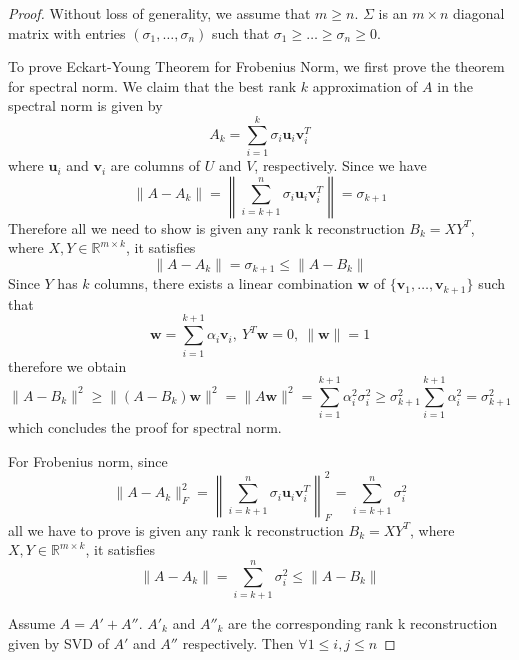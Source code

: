 \documentclass[../book-template.tex]{subfiles}
\begin{document}
\begin{proof}
Without loss of generality, we assume that $m\geq n$. $\Sigma$ is an $m\times n$ diagonal matrix with entries $(\sigma_1,\dots,\sigma_n)$ such that $\sigma_1\geq\dots\geq \sigma_n\geq 0$.
\par To prove Eckart-Young Theorem for Frobenius Norm, we first prove the theorem for spectral norm. We claim that the best rank $k$ approximation of $A$ in the spectral norm is given by
\begin{equation*}
    A_k = \sum_{i=1}^{k}\sigma_i\bm{u}_i\bm{v}^T_i
\end{equation*}
where $\bm{u}_i$ and $\bm{v}_i$ are columns of $U$ and $V$, respectively. Since we have
\begin{equation*}
    \|A-A_k\| = \left\|\sum_{i=k+1}^{n}\sigma_i\bm{u}_i\bm{v}^T_i\right\| = \sigma_{k+1}
\end{equation*}
Therefore all we need to show is given any rank k reconstruction $B_k=XY^T$, where $X,Y\in \mathbb{R}^{m\times k}$, it satisfies
\begin{equation*}
     \|A-A_k\| =\sigma_{k+1}\leq \|A-B_k\|
\end{equation*}
Since $Y$ has $k$ columns, there exists a linear combination $\bm{w}$ of $\{\bm{v}_1,\dots,\bm{v}_{k+1}\}$ such that
\begin{equation*}
    \bm{w} = \sum_{i=1}^{k+1}\alpha_i\bm{v}_i,\ Y^T\bm{w}=0,\ \|\bm{w}\|=1
\end{equation*}
therefore we obtain
\begin{equation*}
    \|A-B_k\|^2\geq \|(A-B_k)\bm{w}\|^2 = \|A\bm{w}\|^2 = \sum_{i=1}^{k+1}\alpha_i^2\sigma_i^2\geq \sigma_{k+1}^2\sum_{i=1}^{k+1}\alpha_i^2 = \sigma_{k+1}^2
\end{equation*}
which concludes the proof for spectral norm.
\par For Frobenius norm, since
\begin{equation*}
    \|A-A_k\|_F^2= \left\|\sum_{i=k+1}^{n}\sigma_i\bm{u}_i\bm{v}^T_i\right\|_F^2 = \sum_{i=k+1}^{n}\sigma_i^2
\end{equation*}
all we have to prove is given any rank k reconstruction $B_k=XY^T$, where $X,Y\in \mathbb{R}^{m\times k}$, it satisfies
\begin{equation*}
     \|A-A_k\| =\sum_{i=k+1}^{n}\sigma_i^2\leq \|A-B_k\|
\end{equation*}
\par Assume $A=A'+A''$. $A'_k$ and $A''_k$ are the corresponding rank k reconstruction given by SVD of $A'$ and $A''$ respectively. Then $\forall 1\leq i,j\leq n$

\end{proof}
\end{document}
